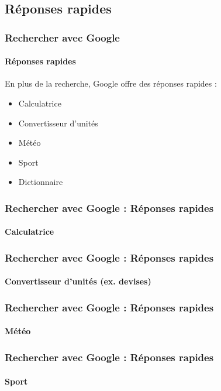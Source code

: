 \documentclass[xcolor=table]{beamer}
\begin{document}
\subsection{Réponses rapides}

\begin{frame}
\frametitle{Rechercher avec Google}
\framesubtitle{Réponses rapides}

En plus de la recherche, Google offre des réponses rapides :
\begin{itemize}
	\item Calculatrice 
	\item Convertisseur d'unités
	\item Météo 
	\item Sport
	\item Dictionnaire
\end{itemize}

\end{frame}

\begin{frame}
\frametitle{Rechercher avec Google : Réponses rapides}
\framesubtitle{Calculatrice}

\begin{center}
\end{center}

\end{frame}

\begin{frame}
\frametitle{Rechercher avec Google : Réponses rapides}
\framesubtitle{Convertisseur d'unités (ex. devises)}

\begin{center}
\end{center}

\end{frame}

\begin{frame}
\frametitle{Rechercher avec Google : Réponses rapides}
\framesubtitle{Météo}

\begin{center}
\end{center}

\end{frame}

\begin{frame}
\frametitle{Rechercher avec Google : Réponses rapides}
\framesubtitle{Sport}

\begin{center}
\end{center}

\end{frame}
\end{document}

